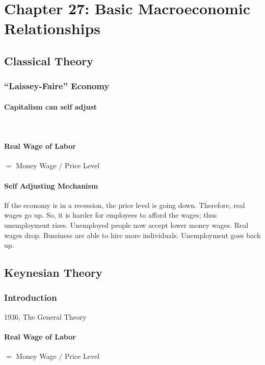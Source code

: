 \newpage
\section{Chapter 27: Basic Macroeconomic Relationships}

\subsection{Classical Theory}

\subsubsection{``Laissey-Faire'' Economy}

	\paragraph{Capitalism can self adjust}\ 

	\paragraph{Real Wage of Labor} $=$ Money Wage $/$ Price Level

	\paragraph{Self Adjusting Mechanism}

	If the economy is in a recession, the price level is going down. Therefore, real wages go up. So, it is harder for employees to afford the wages; thus unemployment rises. Unemployed people now accept lower money wages. Real wages drop. Bussiness are able to hire more individuals. Unemployment goes back up.

\subsection{Keynesian Theory}

\subsubsection{Introduction} 1936, The General Theory
	
	\paragraph{Real Wage of Labor} $=$ Money Wage $/$ Price Level

